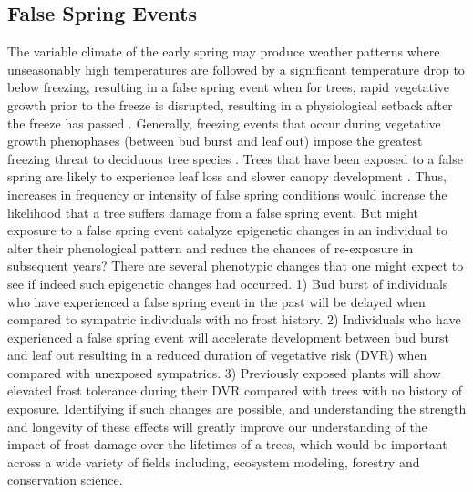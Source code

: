 \documentclass{article}\usepackage[]{graphicx}\usepackage[]{color}
\begin{document}
\subsection*{False Spring Events}
The variable climate of the early spring may produce weather patterns where unseasonably high temperatures are followed by a significant temperature drop to below freezing, resulting in a false spring event when for trees, rapid vegetative growth prior to the freeze is disrupted, resulting in a physiological setback after the freeze has passed \citep{Gu2008}. Generally, freezing events that occur during vegetative growth phenophases (between bud burst and leaf out) impose the greatest freezing threat to deciduous tree species \citep{Lenz2013}. Trees that have been exposed to a false spring are likely to experience leaf loss and slower canopy development \citep{Hufkens2012}. Thus, increases in frequency or intensity of false spring conditions would increase the likelihood that a tree suffers damage from a false spring event. But might exposure to a false spring event catalyze epigenetic changes in an individual to alter their phenological pattern and reduce the chances of re-exposure in subsequent years? There are several phenotypic changes that one might expect to see if indeed such epigenetic changes had occurred. 1) Bud burst of individuals who have experienced a false spring event in the past will be delayed when compared to sympatric individuals with no frost history. 2) Individuals who have experienced a false spring event will accelerate development between bud burst and leaf out resulting in a reduced duration of vegetative risk (DVR) when compared with unexposed sympatrics. 3) Previously exposed plants will show elevated frost tolerance during their DVR compared with trees with no history of exposure. Identifying if such changes are possible, and understanding the strength and longevity of these effects will greatly improve our understanding of the impact of frost damage over the lifetimes of a trees, which would be important across a wide variety of fields including, ecosystem modeling, forestry and conservation science.
\end{document}
